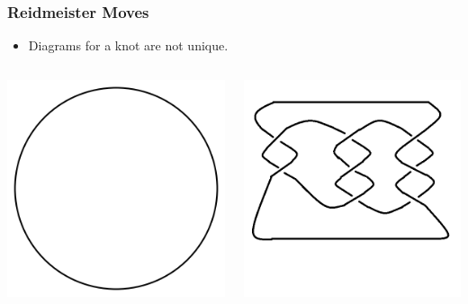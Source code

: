 \documentclass{beamer}
\begin{document}
\begin{frame}
  \frametitle{Reidmeister Moves}
  \begin{itemize}
  \item Diagrams for a knot are not unique.
  \end{itemize}
  \begin{columns}
    \begin{column}{.5\textwidth}
      \begin{center}
        \includegraphics[scale=.3]{unknot}
      \end{center}
    \end{column}
    \begin{column}{.5\textwidth}
      \begin{center}
        \includegraphics[scale=.3]{ugly-unknot}

\end{center}
\end{column}
\end{columns}
\end{frame}
\end{document}
